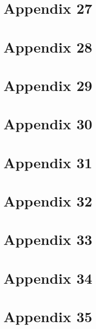 \chapter{Appendix 27}

\chapter{Appendix 28}

\chapter{Appendix 29}

\chapter{Appendix 30}

\chapter{Appendix 31}

\chapter{Appendix 32}

\chapter{Appendix 33}

\chapter{Appendix 34}

\chapter{Appendix 35}

